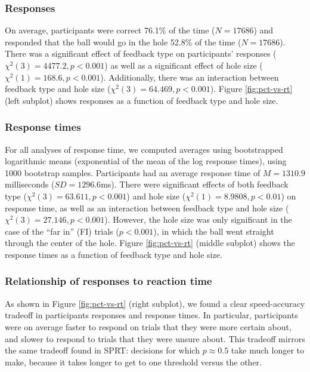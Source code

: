 \documentclass[10pt,letterpaper]{article}
\begin{document}
\subsubsection{Responses}

On average, participants were correct 76.1\% of the time ($N=17686$) and responded that the ball would go in the hole 52.8\% of the time ($N=17686$). There was a significant effect of feedback type on participants' responses ($\chi^2(3)=4477.2, p<0.001$) as well as a significant effect of hole size ($\chi^2(1)=168.6, p<0.001$). Additionally, there was an interaction between feedback type and hole size ($\chi^2(3)=64.469, p<0.001$). Figure \ref{fig:pct-vs-rt} (left subplot) shows responses as a function of feedback type and hole size.

\subsubsection{Response times}

For all analyses of response time, we computed averages using bootstrapped logarithmic means (exponential of the mean of the log response times), using 1000 bootstrap samples. Participants had an average response time of $M=1310.9$ milliseconds ($SD=1296.6$ms). There were significant effects of both feedback type ($\chi^2(3)=63.611, p<0.001$) and hole size ($\chi^2(1)=8.9808, p<0.01$) on response time, as well as an interaction between feedback type and hole size ($\chi^2(3)=27.146, p<0.001$). However, the hole size was only significant in the case of the ``far in'' (FI) trials ($p<0.001$), in which the ball went straight through the center of the hole. Figure \ref{fig:pct-vs-rt} (middle subplot) shows the response times as a function of feedback type and hole size.

\subsubsection{Relationship of responses to reaction time}

As shown in Figure \ref{fig:pct-vs-rt} (right subplot), we found a clear speed-accuracy tradeoff in participants responses and response times. In particular, participants were on average faster to respond on trials that they were more certain about, and slower to respond to trials that they were unsure about. This tradeoff mirrors the same tradeoff found in SPRT: decisions for which $p\approx0.5$ take much longer to make, because it takes longer to get to one threshold versus the other.
\end{document}
